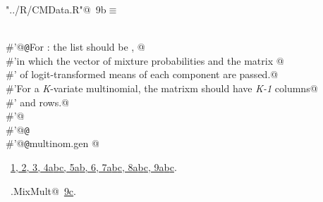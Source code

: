 \documentclass[reqno]{amsart}
\renewcommand{\NWtarget}[2]{\hypertarget{#1}{#2}}
\renewcommand{\NWlink}[2]{\hyperlink{#1}{#2}}
\begin{document}
\begin{flushleft} \small\label{scrap17}\raggedright\small
\NWtarget{nuweb9b}{} \verb@"../R/CMData.R"@\nobreak\ {\footnotesize {9b}}$\equiv$
\vspace{-1ex}
\begin{list}{}{} \item
\mbox{}\verb@@\\
\mbox{}\verb@#'@{\tt @}\verb@details For : the  list should be , @\\
\mbox{}\verb@#'in which the vector of mixture probabilities  and the matrix @\\
\mbox{}\verb@#' of logit-transformed means of each component are passed.@\\
\mbox{}\verb@#'For a \emph{K}-variate multinomial, the matrix{m} should have \emph{K-1} columns@\\
\mbox{}\verb@#' and  rows.@\\
\mbox{}\verb@#'@\\
\mbox{}\verb@#'@{\tt @}\verb@export@\\
\mbox{}\verb@#'@{\tt @}\verb@rdname multinom.gen @\\
\mbox{}\verb@@{\NWsep}
\end{list}
\vspace{-1.5ex}
\footnotesize
\begin{list}{}{\setlength{\itemsep}{-\parsep}\setlength{\itemindent}{-\leftmargin}}
\item \NWtxtFileDefBy\ \NWlink{nuweb1}{1}\NWlink{nuweb2}{, 2}\NWlink{nuweb3}{, 3}\NWlink{nuweb4a}{, 4a}\NWlink{nuweb4b}{b}\NWlink{nuweb4c}{c}\NWlink{nuweb5a}{, 5a}\NWlink{nuweb5b}{b}\NWlink{nuweb6}{, 6}\NWlink{nuweb7a}{, 7a}\NWlink{nuweb7b}{b}\NWlink{nuweb7c}{c}\NWlink{nuweb8a}{, 8a}\NWlink{nuweb8b}{b}\NWlink{nuweb8c}{c}\NWlink{nuweb9a}{, 9a}\NWlink{nuweb9b}{b}\NWlink{nuweb9c}{c}.
\item \NWtxtIdentsUsed\nobreak\  \verb@mg.MixMult@\nobreak\ \NWlink{nuweb9c}{9c}.
\item{}
\end{list}
\vspace{4ex}
\end{flushleft}
\end{document}

